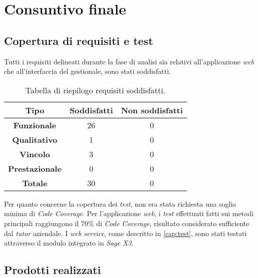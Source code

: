 
\section{Consuntivo finale}

\subsection{Copertura di requisiti e test}

Tutti i requisiti delineati durante la fase di analisi sia relativi all'applicazione \textit{web} che all'interfaccia del gestionale, sono stati soddisfatti.

\begin{center}
	\begin{longtable}{ | c| c | c|}
		\caption{Tabella di riepilogo requisiti soddisfatti.}\\		
		\hline
		\textbf{Tipo} & \textbf{Soddisfatti} & \textbf{Non soddisfatti} \\
		\hline
		\textbf{Funzionale} & 26 & 0 \\
		\hline
		\textbf{Qualitativo} & 1 & 0 \\
		\hline
		\textbf{Vincolo} & 3 & 0 \\
		\hline
		\textbf{Prestazionale} & 0 & 0 \\
		\hline
		\textbf{Totale} & 30 & 0 \\
		\hline
	\end{longtable}
\end{center}


Per quanto concerne la copertura dei \textit{test}, non era stata richiesta una soglia minima di \textit{Code Coverage}. Per l'applicazione \textit{web}, i \textit{test} effettuati fatti sui metodi principali raggiungono il 70\% di \textit{Code Coverage}, risultato considerato sufficiente dal \textit{tutor} aziendale.
I \textit{web service}, come descritto in \ref{cap:test}, sono stati testati attraverso il modulo integrato in \textit{Sage X3}.


\newpage

\subsection{Prodotti realizzati}

